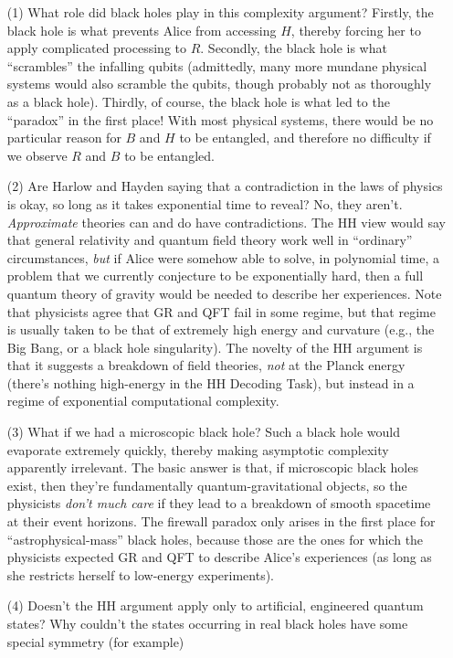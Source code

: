 \documentclass[12pt]{report}
\theoremstyle{plain}
\theoremstyle{definition}
\begin{document}
\begin{enumerate}
\item[(1)] What role did black holes play in this complexity argument?  Firstly, the black hole is what prevents Alice from accessing $H$, thereby forcing her to apply complicated processing to $R$.  Secondly, the black hole is what ``scrambles'' the infalling qubits (admittedly, many more mundane physical systems would also scramble the qubits, though probably not as thoroughly as a black hole).  Thirdly, of course, the black hole is what led to the ``paradox'' in the first place!  With most physical systems, there would be no particular reason for $B$ and $H$ to be entangled, and therefore no difficulty if we observe $R$ and $B$ to be entangled.
\item[(2)] Are Harlow and Hayden saying that a contradiction in the laws of physics is okay, so long as it takes exponential time to reveal?   No, they aren't.   {\em Approximate} theories can and do have contradictions.  The HH view would say that general relativity and quantum field theory work well in ``ordinary'' circumstances, {\em but} if Alice were somehow able to solve, in polynomial time, a problem that we currently conjecture to be exponentially hard, then a full quantum theory of gravity would be needed to describe her experiences.   Note that physicists agree that GR and QFT fail in some regime, but that regime is usually taken to be that of extremely high energy and curvature (e.g., the Big Bang, or a black hole singularity).  The novelty of the HH argument is that it suggests a breakdown of field theories, {\em not}
    at the Planck energy (there's nothing high-energy in the HH Decoding Task), but instead in a regime of exponential computational complexity.
\item[(3)] What if we had a microscopic black hole?  Such a black hole would evaporate extremely quickly, thereby making asymptotic complexity apparently irrelevant.  The basic answer is that, if microscopic black holes exist, then they're fundamentally quantum-gravitational objects, so the physicists {\em don't much care} if they lead to a breakdown of smooth spacetime at their event horizons.  The firewall paradox only arises in the first place for ``astrophysical-mass'' black holes, because those are the ones for which the physicists expected GR and QFT to describe Alice's experiences (as long as she restricts herself to low-energy experiments).
\item[(4)] Doesn't the HH argument apply only to artificial, engineered quantum states?  Why couldn't the states occurring in real black holes have some special symmetry (for example)

\end{enumerate}
\end{document}
